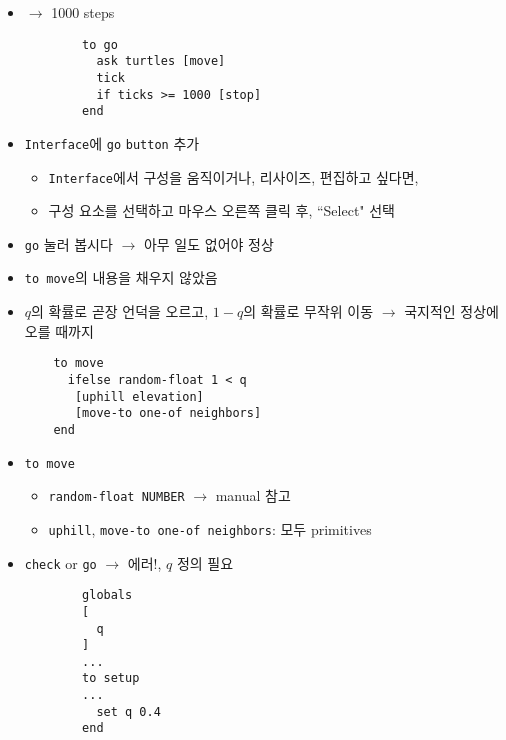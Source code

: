 \documentclass[hyperref={unicode}]{beamer}
\begin{document}
\begin{frame}[fragile]
\begin{itemize}
\item $\rightarrow$ 1000 steps
		\begin{verbatim}
		to go
		  ask turtles [move]
		  tick
		  if ticks >= 1000 [stop]
		end
		\end{verbatim}
\item \verb|Interface|에 \verb|go| \verb|button| 추가 
	\begin{itemize}
	\item \verb|Interface|에서 구성을 움직이거나, 리사이즈, 편집하고 싶다면, 
	\item 구성 요소를 선택하고 마우스 오른쪽 클릭 후, ``Select" 선택
	\end{itemize}
\item \verb|go| 눌러 봅시다 $\rightarrow$ 아무 일도 없어야 정상
\end{itemize}	
\end{frame}

\begin{frame}[fragile]
\begin{itemize}
\item \verb|to move|의 내용을 채우지 않았음
\item $q$의 확률로 곧장 언덕을 오르고, $1-q$의 확률로 무작위 이동 $\rightarrow$ 국지적인 정상에 오를 때까지
	\begin{verbatim}
	to move
	  ifelse random-float 1 < q
	   [uphill elevation]
	   [move-to one-of neighbors]
	end
	\end{verbatim}
\end{itemize}	
\end{frame}

\begin{frame}[fragile]
\begin{itemize}
\item \verb|to move|
	\begin{itemize}
	\item \verb|random-float NUMBER| $\rightarrow$ manual 참고
	\item \verb|uphill|, \verb|move-to one-of neighbors|: 모두 primitives
	\end{itemize}
\item \verb|check| or \verb|go| $\rightarrow$ 에러!, $q$ 정의 필요
		\begin{verbatim}
		globals
		[
		  q
		]
		...
		to setup
		...
		  set q 0.4
		end
		\end{verbatim}
\end{itemize}	
\end{frame}
\end{document}
